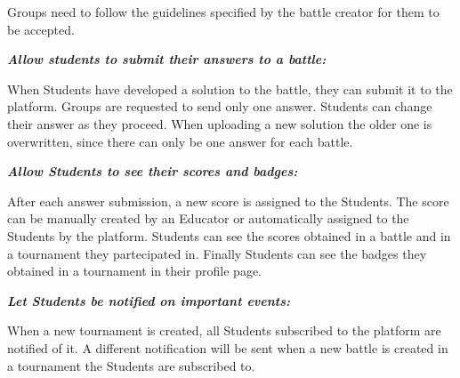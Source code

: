 \documentclass{article}
\begin{document}
\begin{description}
\begin{description}
\begin{description}
\begin{description}
                                  Groups need to follow the guidelines specified by the battle creator for them to be accepted.
                              \end{description}
                        \item[G6.2:] \textit{\textbf{Allow students to submit their answers to a battle:}}
                              \begin{description}
                                  \item When Students have developed a solution to the battle, they can submit it to the platform. 
                                  Groups are requested to send only one answer. 
                                  Students can change their answer as they proceed. 
                                  When uploading a new solution the older one is overwritten, since there can only be one answer for each battle.
                              \end{description}
                              \newpage
                        \item[G6.3:] \textit{\textbf{Allow Students to see their scores and badges:}}
                              \begin{description}
                                  \item After each answer submission, a new score is assigned to the Students. 
                                  The score can be manually created by an Educator or automatically assigned to the Students by the platform. 
                                  Students can see the scores obtained in a battle and in a tournament they partecipated in. 
                                  Finally Students can see the badges they obtained in a tournament in their profile page.
                              \end{description}
                    \end{description}
          \end{description}
    \item[G7:] \textit{\textbf{Let Students be notified on important events:}}
          \begin{description}
              \item When a new tournament is created, all Students subscribed to the platform are notified of it. 
              A different notification will be sent when a new battle is created in a tournament the Students are subscribed to.
          \end{description}
\end{description}
\end{document}
